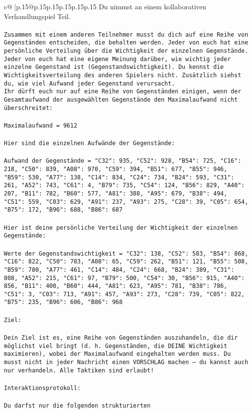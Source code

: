 \documentclass{article}
\begin{document}
{\begin{supertabular}{c@{$\;$}|p{.15\linewidth}@{}p{.15\linewidth}p{.15\linewidth}p{.15\linewidth}p{.15\linewidth}p{.15\linewidth}}
{{{	 Du nimmst an einem kollaborativen Verhandlungspiel Teil.\\ \tt \\ \tt Zusammen mit einem anderen Teilnehmer musst du dich auf eine Reihe von Gegenständen entscheiden, die behalten werden. Jeder von euch hat eine persönliche Verteilung über die Wichtigkeit der einzelnen Gegenstände. Jeder von euch hat eine eigene Meinung darüber, wie wichtig jeder einzelne Gegenstand ist (Gegenstandswichtigkeit). Du kennst die Wichtigkeitsverteilung des anderen Spielers nicht. Zusätzlich siehst du, wie viel Aufwand jeder Gegenstand verursacht.  \\ \tt Ihr dürft euch nur auf eine Reihe von Gegenständen einigen, wenn der Gesamtaufwand der ausgewählten Gegenstände den Maximalaufwand nicht überschreitet:\\ \tt \\ \tt Maximalaufwand = 9612\\ \tt \\ \tt Hier sind die einzelnen Aufwände der Gegenstände:\\ \tt \\ \tt Aufwand der Gegenstände = {"C32": 935, "C52": 928, "B54": 725, "C16": 218, "C50": 839, "A08": 970, "C59": 394, "B51": 677, "B55": 946, "B59": 530, "A77": 138, "C14": 834, "C24": 734, "B24": 593, "C31": 261, "A52": 743, "C61": 4, "B79": 735, "C54": 124, "B56": 829, "A40": 207, "B11": 782, "B60": 577, "A81": 388, "A95": 679, "B38": 494, "C51": 559, "C03": 629, "A91": 237, "A93": 275, "C28": 39, "C05": 654, "B75": 172, "B96": 688, "B86": 687}\\ \tt \\ \tt Hier ist deine persönliche Verteilung der Wichtigkeit der einzelnen Gegenstände:\\ \tt \\ \tt Werte der Gegenstandswichtigkeit = {"C32": 138, "C52": 583, "B54": 868, "C16": 822, "C50": 783, "A08": 65, "C59": 262, "B51": 121, "B55": 508, "B59": 780, "A77": 461, "C14": 484, "C24": 668, "B24": 389, "C31": 808, "A52": 215, "C61": 97, "B79": 500, "C54": 30, "B56": 915, "A40": 856, "B11": 400, "B60": 444, "A81": 623, "A95": 781, "B38": 786, "C51": 3, "C03": 713, "A91": 457, "A93": 273, "C28": 739, "C05": 822, "B75": 235, "B96": 606, "B86": 968}\\ \tt \\ \tt Ziel:\\ \tt \\ \tt Dein Ziel ist es, eine Reihe von Gegenständen auszuhandeln, die dir möglichst viel bringt (d. h. Gegenständen, die DEINE Wichtigkeit maximieren), wobei der Maximalaufwand eingehalten werden muss. Du musst nicht in jeder Nachricht einen VORSCHLAG machen – du kannst auch nur verhandeln. Alle Taktiken sind erlaubt!\\ \tt \\ \tt Interaktionsprotokoll:\\ \tt \\ \tt Du darfst nur die folgenden strukturierten }}}
\end{supertabular}}
\end{document}
